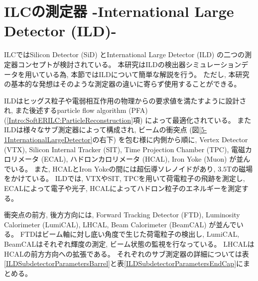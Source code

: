 \section{ILCの測定器 -International Large Detector (ILD)-} \label{Intro:InternationalLargeDetector}

ILCではSilicon Detector (SiD) とInternational Large Detector (ILD) の二つの測定器コンセプトが検討されている。
本研究はILDの検出器シミュレーションデータを用いている為, 本節ではILDについて簡単な解説を行う。
ただし, 本研究の基本的な発想はそのような測定器の違いに寄らず使用することができる。

ILDはヒッグス粒子や電弱相互作用の物理からの要求値を満たすように設計され, また後述するparticle flow algorithm (PFA) (\ref{Intro:SoftERILC:ParticleReconstruction}項) によって最適化されている。
またILDは様々なサブ測定器によって構成され, ビームの衝突点 (図\ref{5-1InternationalLargeDetector}の右下) を包む様に内側から順に, Vertex Detector (VTX), Silicon Internal Tracker (SIT), Time Projection Chamber (TPC), 電磁カロリメータ (ECAL), ハドロンカロリメータ (HCAL), Iron Yoke (Muon) が並んでいる。
また, HCALとIron Yokeの間には超伝導ソレノイドがあり, $3.5 \mathrm{T}$の磁場をかけている。
ILDでは, VTXやSIT, TPCを用いて荷電粒子の飛跡を測定し, ECALによって電子や光子, HCALによってハドロン粒子のエネルギーを測定する。

衝突点の前方, 後方方向には, Forward Tracking Detector (FTD), Luminosity Calorimeter (LumiCAL), LHCAL, Beam Calorimeter (BeamCAL) が並んでいる。
FTDはビーム軸に対し底い角度で生じた荷電粒子の検出し, LumiCAL, BeamCALはそれぞれ輝度の測定, ビーム状態の監視を行なっている。
LHCALはHCALの前方方向への拡張である。
それぞれのサブ測定器の詳細については表\ref{ILDSubdetectorParametersBarrel}と表\ref{ILDSubdetectorParametersEndCap}にまとめる。

